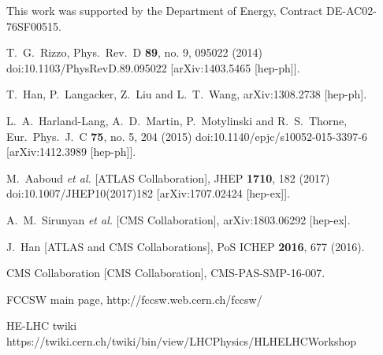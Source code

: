 \documentclass[14pt]{article}
\begin{document}
%
This work was supported by the Department of Energy, Contract DE-AC02-76SF00515.




\begin{thebibliography}{99}


  T.~G.~Rizzo,
  Phys.\ Rev.\ D {\bf 89}, no. 9, 095022 (2014)
  doi:10.1103/PhysRevD.89.095022
  [arXiv:1403.5465 [hep-ph]].
  
  T.~Han, P.~Langacker, Z.~Liu and L.~T.~Wang,
  arXiv:1308.2738 [hep-ph].
 
  L.~A.~Harland-Lang, A.~D.~Martin, P.~Motylinski and R.~S.~Thorne,
  Eur.\ Phys.\ J.\ C {\bf 75}, no. 5, 204 (2015)
  doi:10.1140/epjc/s10052-015-3397-6
  [arXiv:1412.3989 [hep-ph]].
  

  M.~Aaboud {\it et al.} [ATLAS Collaboration],
  JHEP {\bf 1710}, 182 (2017)
  doi:10.1007/JHEP10(2017)182
  [arXiv:1707.02424 [hep-ex]].


  A.~M.~Sirunyan {\it et al.} [CMS Collaboration],
  arXiv:1803.06292 [hep-ex].


  J.~Han [ATLAS and CMS Collaborations],
  PoS ICHEP {\bf 2016}, 677 (2016).
 
  CMS Collaboration [CMS Collaboration],
  CMS-PAS-SMP-16-007.
  
 FCCSW main page, http://fccsw.web.cern.ch/fccsw/

 HE-LHC twiki https://twiki.cern.ch/twiki/bin/view/LHCPhysics/HLHELHCWorkshop

\end{thebibliography}

\end{document}
